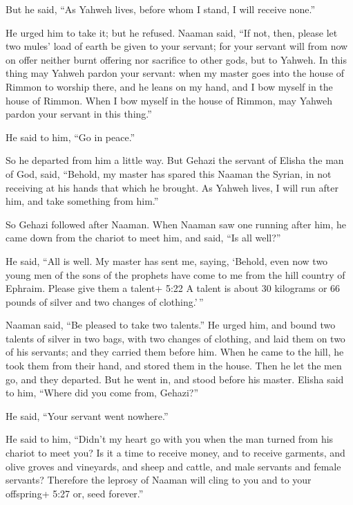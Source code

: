  But he said, ``As Yahweh lives, before whom I stand, I
will receive none.''

He urged him to take it; but he refused.  Naaman said, ``If
not, then, please let two mules' load of earth be given to your servant;
for your servant will from now on offer neither burnt offering nor
sacrifice to other gods, but to Yahweh.  In this thing may
Yahweh pardon your servant: when my master goes into the house of Rimmon
to worship there, and he leans on my hand, and I bow myself in the house
of Rimmon. When I bow myself in the house of Rimmon, may Yahweh pardon
your servant in this thing.''

 He said to him, ``Go in peace.''

So he departed from him a little way.  But Gehazi the
servant of Elisha the man of God, said, ``Behold, my master has spared
this Naaman the Syrian, in not receiving at his hands that which he
brought. As Yahweh lives, I will run after him, and take something from
him.''

 So Gehazi followed after Naaman. When Naaman saw one
running after him, he came down from the chariot to meet him, and said,
``Is all well?''

 He said, ``All is well. My master has sent me, saying,
`Behold, even now two young men of the sons of the prophets have come to
me from the hill country of Ephraim. Please give them a talent+ 5:22 A
talent is about 30 kilograms or 66 pounds of silver and two changes of
clothing.'\,''

 Naaman said, ``Be pleased to take two talents.'' He urged
him, and bound two talents of silver in two bags, with two changes of
clothing, and laid them on two of his servants; and they carried them
before him.  When he came to the hill, he took them from
their hand, and stored them in the house. Then he let the men go, and
they departed.  But he went in, and stood before his
master. Elisha said to him, ``Where did you come from, Gehazi?''

He said, ``Your servant went nowhere.''

 He said to him, ``Didn't my heart go with you when the man
turned from his chariot to meet you? Is it a time to receive money, and
to receive garments, and olive groves and vineyards, and sheep and
cattle, and male servants and female servants?  Therefore
the leprosy of Naaman will cling to you and to your offspring+ 5:27 or,
seed forever.''

